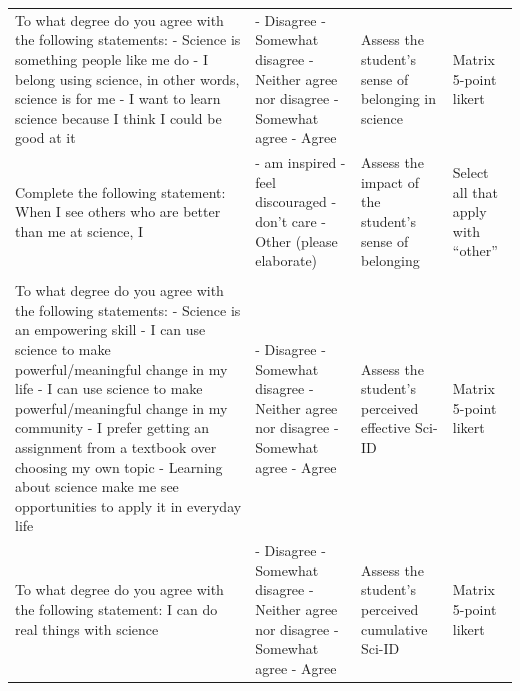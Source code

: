 \documentclass[10pt, twocolumn]{article}
\begin{document}
\begin{xltabular}{\textwidth}{|p{0.3\textwidth}|p{0.3\textwidth}|p{0.2\textwidth}|X|}
     \\ \hline
    To what degree do you agree with the following statements: \newline - Science is something people like me do \newline - I belong using science, in other words, science is for me \newline - I want to learn science because I think I could be good at it & - Disagree \newline - Somewhat disagree \newline - Neither agree nor disagree \newline - Somewhat agree \newline - Agree & Assess the student's sense of belonging in science & Matrix 5-point likert \\ \hline
    Complete the following statement: When I see others who are better than me at science, I & - am inspired \newline - feel discouraged \newline - don't care \newline - Other (please elaborate) & Assess the impact of the student's sense of belonging & Select all that apply with ``other'' \\ \hline
     \\ \hline
    To what degree do you agree with the following statements: \newline - Science is an empowering skill \newline - I can use science to make powerful/meaningful change in my life \newline - I can use science to make powerful/meaningful change in my community \newline - I prefer getting an assignment from a textbook over choosing my own topic \newline - Learning about science make me see opportunities to apply it in everyday life & - Disagree \newline - Somewhat disagree \newline - Neither agree nor disagree \newline - Somewhat agree \newline - Agree & Assess the student's perceived effective Sci-ID & Matrix 5-point likert \\ \hline
    To what degree do you agree with the following statement: \newline I can do real things with science & - Disagree \newline - Somewhat disagree \newline - Neither agree nor disagree \newline - Somewhat agree \newline - Agree & Assess the student's perceived cumulative Sci-ID & Matrix 5-point likert \\ \hline
\end{xltabular}
\end{document}
